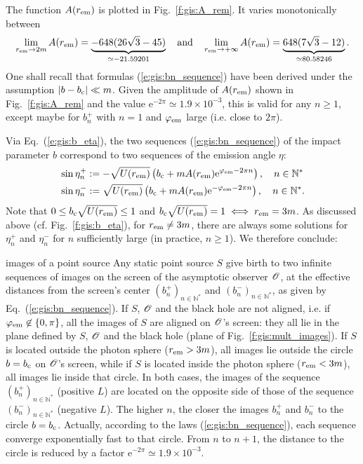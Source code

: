 The function $A(r_{\rm em})$ is plotted in Fig.~\ref{f:gis:A_rem}.
It varies monotonically between
\[
\lim_{r_{\rm em}\to 2m} A(r_{\rm em}) = \underbrace{- 648(26\sqrt{3} - 45)}_{\simeq -21.59201}
\quad\mbox{and}\quad
\lim_{r_{\rm em}\to +\infty} A(r_{\rm em}) = \underbrace{648(7\sqrt{3} - 12)}_{\simeq 80.58246}.
\]
One shall recall that formulas (\ref{e:gis:bn_sequence}) have been derived
under the assumption $|b - b_{\rm c}| \ll m$. Given the amplitude of $A(r_{\rm em})$
shown in Fig.~\ref{f:gis:A_rem} and the value $\mathrm{e}^{-2\pi} \simeq 1.9\times 10^{-3}$,
this is valid for any $n\geq 1$, except maybe for $b_n^+$ with $n=1$ and $\varphi_{\rm em}$
large (i.e. close to $2\pi$).

Via Eq.~(\ref{e:gis:b_eta}), the two sequences (\ref{e:gis:bn_sequence}) of the impact parameter $b$
correspond to two sequences of the emission angle $\eta$:
\begin{subequations}
\begin{align}
&\sin\eta_n^+ := - \sqrt{U(r_{\rm em})}
\left( b_{\rm c} + m A(r_{\rm em})  \mathrm{e}^{\varphi_{\rm em} - 2\pi n} \right), \quad
n\in \mathbb{N}^* \\
&\sin\eta_n^- := \sqrt{U(r_{\rm em})}
\left( b_{\rm c} + m A(r_{\rm em})  \mathrm{e}^{-\varphi_{\rm em} - 2\pi n} \right),
\quad n\in \mathbb{N}^*.
\end{align}
\end{subequations}
Note that $0 \leq b_{\rm c} \sqrt{U(r_{\rm em})} \leq 1$ and
$b_{\rm c} \sqrt{U(r_{\rm em})} = 1 \iff r_{\rm em} = 3m$.
As discussed above (cf. Fig.~\ref{f:gis:b_eta}), for $r_{\rm em} \not= 3m$,
there are always some solutions for $\eta_n^+$ and $\eta_n^-$ for $n$
sufficiently large (in practice, $n\geq 1$). We therefore conclude:
\begin{tprop}{images of a point source}{}
Any static point source $S$ give birth to two infinite sequences of images
on the screen of the asymptotic observer $\mathscr{O}$, at the effective distances
from the screen's center
$(b_n^+)_{n\in\mathbb{N}^*}$ and $(b_n^-)_{n\in\mathbb{N}^*}$, as
given by Eq.~(\ref{e:gis:bn_sequence}).
If $S$, $\mathscr{O}$ and the black hole are not aligned, i.e. if
$\varphi_{\rm em} \not\in\{0, \pi\}$,
all the images of $S$ are aligned on $\mathscr{O}$'s screen: they
all lie in the plane defined by $S$, $\mathscr{O}$ and the black hole (plane of
Fig.~\ref{f:gis:mult_images}). If $S$ is located outside the photon sphere
($r_{\rm em} > 3m$), all images lie outside the circle $b=b_{\rm c}$ on $\mathscr{O}$'s screen,
while if $S$ is located inside the photon sphere ($r_{\rm em} < 3m$),
all images lie inside that circle. In both cases,
the images of the sequence $(b_n^+)_{n\in\mathbb{N}^*}$ (positive $L$)
are located on the opposite side of those of the sequence
$(b_n^-)_{n\in\mathbb{N}^*}$ (negative $L$). The higher $n$, the closer
the images $b_n^+$ and $b_n^-$ to the circle $b=b_{\rm c}$. Actually,
according to the laws (\ref{e:gis:bn_sequence}),
each sequence converge exponentially fast to that circle. From $n$ to $n+1$,
the distance to the circle is reduced by a factor
$\mathrm{e}^{- 2\pi}\simeq 1.9\times 10^{-3}$.
\end{tprop}

